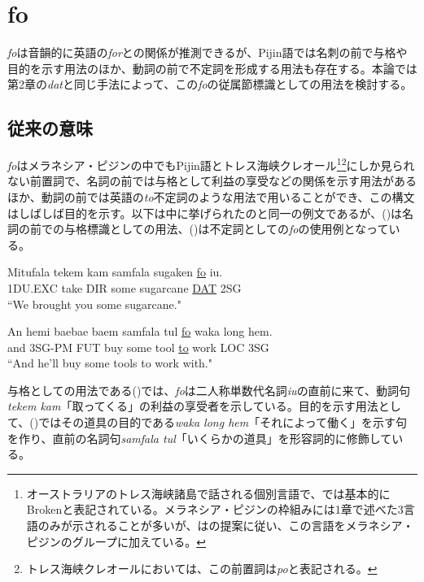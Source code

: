 \chapter{fo}
\textit{fo}は音韻的に英語の\textit{for}との関係が推測できるが、Pijin語では名刺の前で与格や目的を示す用法のほか、動詞の前で不定詞を形成する用法も存在する。本論では第2章の\textit{dat}と同じ手法によって、この\textit{fo}の従属節標識としての用法を検討する。

\section{従来の意味}\label{sec:originalfo}
\textit{fo}はメラネシア・ピジンの中でもPijin語とトレス海峡クレオール\footnote{
\label{fn:broken}オーストラリアのトレス海峡諸島で話される個別言語で、\cite{prepositions}では基本的にBrokenと表記されている。メラネシア・ピジンの枠組みには1章で述べた3言語のみが示されることが多いが、\cite{prepositions}は\cite{keesing}の提案に従い、この言語をメラネシア・ピジンのグループに加えている。}\footnote{
トレス海峡クレオールにおいては、この前置詞は\textit{po}と表記される\citep{prepositions}。}にしか見られない前置詞で、名詞の前では与格として利益の享受などの関係を示す用法があるほか、動詞の前では英語の\textit{to}不定詞のような用法で用いることができ、この構文はしばしば目的を示す\citep{prepositions}。以下は\cite{prepositions}中に挙げられたのと同一の例文であるが、()は名詞の前での与格標識としての用法、()は不定詞としての\textit{fo}の使用例となっている。

\begin{exe}
\ex
\gll Mitufala tekem kam samfala sugaken \underline{fo} iu.\\
1DU.EXC take DIR some sugarcane \underline{DAT} 2SG\\
\glt ``We brought you some sugarcane." \cite[44]{rr2}

\ex\label{ex:fowaka}
\gll An hemi baebae baem samfala tul \underline{fo} waka long hem.\\
and 3SG-PM FUT buy some tool \underline{to} work LOC 3SG\\
\glt ``And he'll buy some tools to work with." \cite[270]{todd}
\end{exe}

与格としての用法である()では、\textit{fo}は二人称単数代名詞\textit{iu}の直前に来て、動詞句\textit{tekem kam}「取ってくる」の利益の享受者を示している。目的を示す用法として、()ではその道具の目的である\textit{waka long hem}「それによって働く」を示す句を作り、直前の名詞句\textit{samfala tul}「いくらかの道具」を形容詞的に修飾している。

